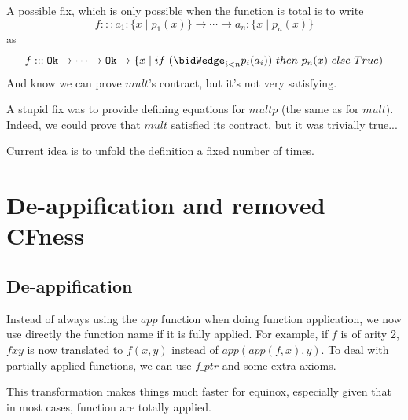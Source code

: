 \documentclass{article}
\begin{document}
A possible fix, which is only possible when the function is total is
to write $$f ::: a_1:\{x \mid p_1(x) \} \to \cdots \to a_n:\{x \mid
p_n(x) \}$$ as $$f ::: \ok \to \cdots \to \ok \to \{x \mid
if~(\bidWedge_{i < n} p_i(a_i))~then~p_n(x)~else~True)$$ And know we
can prove $mult$'s contract, but it's not very satisfying.

A stupid fix was to provide defining equations for $multp$ (the same
as for $mult$). Indeed, we could prove that $mult$ satisfied its
contract, but it was trivially true...

Current idea is to unfold the definition a fixed number of times.

\section{De-appification and removed CFness}
\subsection{De-appification}
Instead of always using the $app$ function when doing function
application, we now use directly the function name if it is fully
applied. For example, if $f$ is of arity 2, $f x y$ is now translated
to $f(x,y)$ instead of $app(app(f,x),y)$.  To deal with partially
applied functions, we can use $f\_ptr$ and some extra axioms. 

This transformation makes things much faster for equinox, especially
given that in most cases, function are totally applied.
\end{document}
